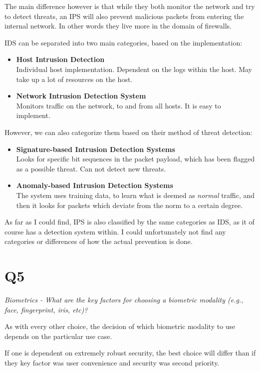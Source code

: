 \documentclass{article}
\begin{document}
The main difference however is that while they both monitor the network and try to detect threats, an IPS will also prevent malicious packets from entering the internal network. In other words they live more in the domain of firewalls.

IDS can be separated into two main categories, based on the implementation:
\begin{itemize}
  \item{\textbf{Host Intrusion Detection}\\Individual host implementation. Dependent on the logs within the host. May take up a lot of resources on the host.}
  \item{\textbf{Network Intrusion Detection System}\\Monitors traffic on the network, to and from all hosts. It is easy to implement.}
\end{itemize}

However, we can also categorize them based on their method of threat detection:
\begin{itemize}
  \item{\textbf{Signature-based Intrusion Detection Systems}\\Looks for specific bit sequences in the packet payload, which has been flagged as a possible threat. Can not detect new threats.}
  \item{\textbf{Anomaly-based Intrusion Detection Systems}\\The system uses training data, to learn what is deemed as \textit{normal} traffic, and then it looks for packets which deviate from the norm to a certain degree.}
\end{itemize}

As far as I could find, IPS is also classified by the same categories as IDS, as it of course has a detection system within. I could unfortunately not find any categories or differences of how the actual prevention is done.

\newpage
\section{Q5}
\begin{tcolorbox}
  \textit{Biometrics - What are the key factors for choosing a biometric modality (e.g., face, fingerprint, iris, etc)?}
\end{tcolorbox}
As with every other choice, the decision of which biometric modality to use depends on the particular use case.

If one is dependent on extremely robust security, the best choice will differ than if they key factor was user convenience and security was second priority.
\end{document}
